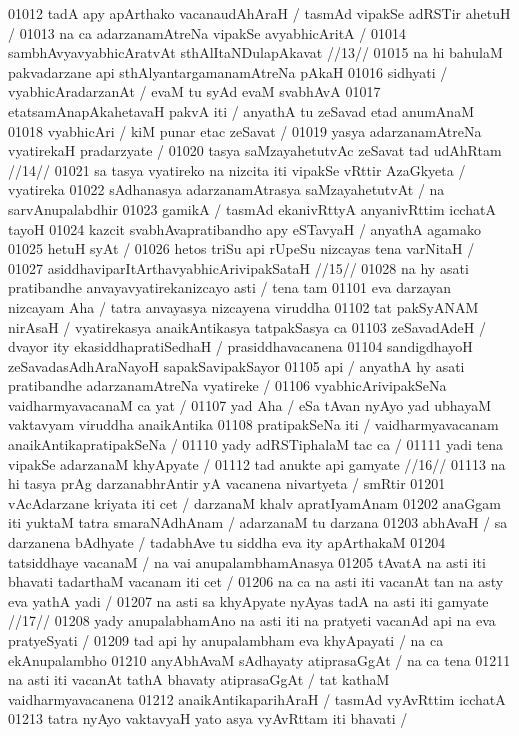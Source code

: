 01012 tadA apy apArthako vacanaudAhAraH / tasmAd vipakSe adRSTir ahetuH / 
01013 	na ca adarzanamAtreNa vipakSe avyabhicAritA /  
01014 	sambhAvyavyabhicAratvAt sthAlItaNDulapAkavat //13//  
01015 na hi bahulaM pakvadarzane api sthAlyantargamanamAtreNa pAkaH 
01016 sidhyati / vyabhicAradarzanAt / evaM tu syAd evaM svabhAvA 
01017 etatsamAnapAkahetavaH pakvA iti / anyathA tu zeSavad etad anumAnaM
01018 vyabhicAri / kiM punar etac zeSavat /
01019 	yasya adarzanamAtreNa vyatirekaH pradarzyate /
01020 	tasya saMzayahetutvAc zeSavat tad udAhRtam //14//  
01021 sa tasya vyatireko na nizcita iti vipakSe vRttir AzaGkyeta / vyatireka  
01022 sAdhanasya adarzanamAtrasya saMzayahetutvAt / na sarvAnupalabdhir  
01023 gamikA / tasmAd ekanivRttyA anyanivRttim icchatA tayoH  
01024 kazcit svabhAvapratibandho apy eSTavyaH / anyathA agamako
01025 hetuH syAt / 
01026 	hetos triSu api rUpeSu nizcayas tena varNitaH /
01027 	asiddhaviparItArthavyabhicArivipakSataH //15// 
01028 na hy asati pratibandhe anvayavyatirekanizcayo asti / tena tam 
01101 eva darzayan nizcayam Aha / tatra anvayasya nizcayena viruddha 
01102 tat pakSyANAM nirAsaH / vyatirekasya anaikAntikasya tatpakSasya ca
01103 zeSavadAdeH / dvayor ity ekasiddhapratiSedhaH / prasiddhavacanena 
01104 sandigdhayoH zeSavadasAdhAraNayoH sapakSavipakSayor 
01105 api / anyathA hy asati pratibandhe adarzanamAtreNa vyatireke /
01106 	vyabhicArivipakSeNa vaidharmyavacanaM ca yat /  
01107 yad Aha / eSa tAvan nyAyo yad ubhayaM vaktavyam viruddha anaikAntika
01108 pratipakSeNa iti / vaidharmyavacanam anaikAntikapratipakSeNa /
01110 	yady adRSTiphalaM tac ca /  
01111 yadi tena vipakSe adarzanaM khyApyate / 
01112 	tad anukte api gamyate //16// 
01113 na hi tasya prAg darzanabhrAntir yA vacanena nivartyeta / smRtir
01201 vAcAdarzane kriyata iti cet / darzanaM khalv apratIyamAnam  
01202 anaGgam iti yuktaM tatra smaraNAdhAnam / adarzanaM tu darzana  
01203 abhAvaH / sa darzanena bAdhyate / tadabhAve tu siddha eva ity apArthakaM
01204 tatsiddhaye vacanaM / na vai anupalambhamAnasya 
01205 tAvatA na asti iti bhavati tadarthaM vacanam iti cet /  
01206 	na ca na asti iti vacanAt tan na asty eva yathA yadi / 
01207 	na asti sa khyApyate nyAyas tadA na asti iti gamyate //17//
01208 yady anupalabhamAno na asti iti na pratyeti vacanAd api na eva pratyeSyati /
01209 tad api hy anupalambham eva khyApayati / na ca ekAnupalambho  
01210 anyAbhAvaM sAdhayaty atiprasaGgAt / na ca tena  
01211 na asti iti vacanAt tathA bhavaty atiprasaGgAt / tat kathaM vaidharmyavacanena
01212 anaikAntikaparihAraH / tasmAd vyAvRttim icchatA
01213 tatra nyAyo vaktavyaH yato asya vyAvRttam iti bhavati /  
